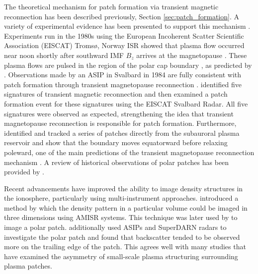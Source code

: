 The theoretical mechanism for patch formation via transient magnetic reconnection has been described previously, Section \ref{sec:patch_formation}.  A variety of experimental evidence has been presented to support this mechanism \citep{Cowley1998,Carlson2002}.  Experiments run in the 1980s using the European Incoherent Scatter Scientific Association (EISCAT) Troms\o, Norway ISR showed that plasma flow occurred near noon shortly after southward IMF \(B_z\) arrives at the magnetopause \citep{Etemadi1988,Todd1988}.  These plasma flows are pulsed in the region of the polar cap boundary \citep{Lockwood1993a,Lockwood1993b}, as predicted by \citet{Cowley1991}.  Observations made by an ASIP in Svalbard in 1984 are fully consistent with patch formation through transient magnetopause reconnection \citep{Carlson1996,Carlson2002}.  \citet{Carlson2004} identified five signatures of transient magnetic reconnection and then examined a patch formation event for these signatures using the EISCAT Svalbard Radar.  All five signatures were observed as expected, strengthening the idea that transient magnetopause reconnection is responsible for patch formation.  Furthermore, \citet{Carlson2006} identified and tracked a series of patches directly from the subauroral plasma reservoir and show that the boundary moves equatorward before relaxing poleward, one of the main predictions of the transient magnetopause reconnection mechanism \citep{Lockwood1992b}.  A review of historical observations of polar patches has been provided by \citet{Crowley1996}.



Recent advancements have improved the ability to image density structures in the ionosphere, particularly using multi-instrument approaches.  \citet{Semeter2009} introduced a method by which the density pattern in a particular volume could be imaged in three dimensions using AMISR systems.  This technique was later used by \citet{Dahlgren2012a,Dahlgren2012b} to image a polar patch.  \citet{Dahlgren2012b} additionally used ASIPs and SuperDARN radars to investigate the polar patch and found that backscatter tended to be observed more on the trailing edge of the patch.  This agrees well with many studies that have examined the asymmetry of small-scale plasma structuring surrounding plasma patches.  

